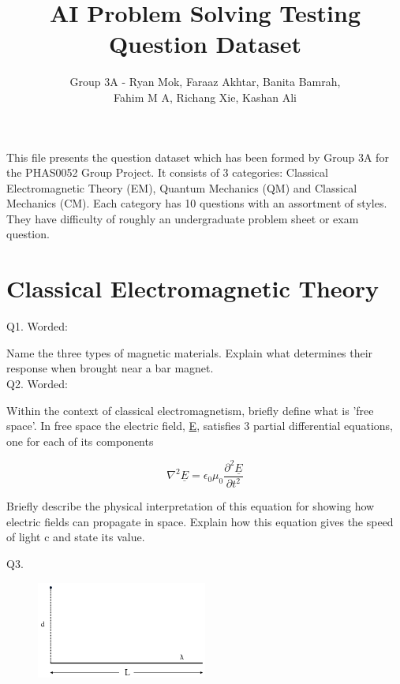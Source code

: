 \documentclass[a4paper,11pt]{article}
\begin{document}
\title{AI Problem Solving Testing \\ Question Dataset }
\author{Group 3A - Ryan Mok, Faraaz Akhtar, Banita Bamrah, \\ Fahim M A, Richang Xie, Kashan Ali }
\date{}
\maketitle

\vspace{4.0cm} \noindent This file presents the question dataset which has been formed by Group 3A for the PHAS0052 Group Project. It consists of 3 categories: Classical Electromagnetic Theory (EM), Quantum Mechanics (QM) and Classical Mechanics (CM). Each category has 10 questions with an assortment of styles. They have difficulty of roughly an undergraduate problem sheet or exam question. 

\newpage{}

\section{Classical Electromagnetic Theory}

\noindent Q1. Worded: 

\noindent Name the three types of magnetic materials. Explain what determines their response when brought near a bar magnet. \\

\noindent Q2. Worded:

\noindent Within the context of classical electromagnetism, briefly define what is 'free space'. In free space the electric field, \underline{E}, satisfies 3 partial differential equations, one for each of its components

\[
\nabla^{2}\underline{E} =  \epsilon_{0}\mu_{0}\frac{\partial^2 \underline{E}}{\partial t^{2}}
\]

\noindent Briefly describe the physical interpretation of this equation for showing how electric fields can propagate in space. Explain how this equation gives the speed of light c and state its value. 

\bigskip

\noindent Q3.

\begin{figure}[h!]
    \centering
    \includegraphics[width=0.5\textwidth]{EMq3figure.PNG}
    \caption*{}
\end{figure}
\end{document}
